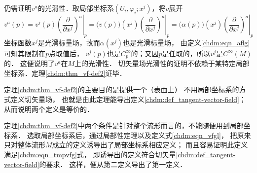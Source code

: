 仍需证明$v^a$的光滑性．取局部坐标系$(U_i,\varphi_i;x^j)$，将$v$展开
\begin{equation}\label{chdm:eqn_tmpadf23}
    v^a(p) = v^j(p) \left.\left(\frac{\partial }{\partial x^j}\right)^a \right|_p
      = \bigl(v(p)\bigr)(x^j) \left.\left(\frac{\partial }{\partial x^j}\right)^a \right|_p
      = \bigl(\alpha(p)\bigr)(x^j) \left.\left(\frac{\partial }{\partial x^j}\right)^a \right|_p
\end{equation}  %
坐标函数$x^j$是光滑标量场，故而$\alpha(x^j)$也是光滑标量场，
由定义\eqref{chdm:eqn_aflg}可知其限制在$p$点取值后，
$v^j(p)$也是$C^\infty_p$的；又因$p$是任取的，所以$v^j$是$C^\infty(M)$的．
这便说明了$v^a$在$M$上的光滑性．
切矢量场光滑性的证明不依赖于某特定局部坐标系．定理\ref{chdm:thm_vf-def2}证毕．

\begin{remark}
    定理\ref{chdm:thm_vf-def2}的主要目的是提供一个（表面上）
    不用局部坐标系的方式定义切矢量场，
    也就是由此定理能导出定义\ref{chdm:def_tangent-vector-field}；
    从而说明两个定义是等价的．

    定理\ref{chdm:thm_vf-def2}中两个条件是针对整个流形而言的，不能随便用到局部坐标系．
    选取局部坐标系后，通过局部性定理以及定义式\eqref{chdm:eqn_vfgl}，
    把原来只对整体流形$M$成立的定义诱导出了局部坐标系相应定义；
    而且容易证明此定义满足\eqref{chdm:eqn_tmpvfg}式，
    即诱导出的定义符合切矢量\ref{chdm:def_tangent-vector-field}的要求．
    这样，便从第二定义导出了第一定义．
\end{remark}




